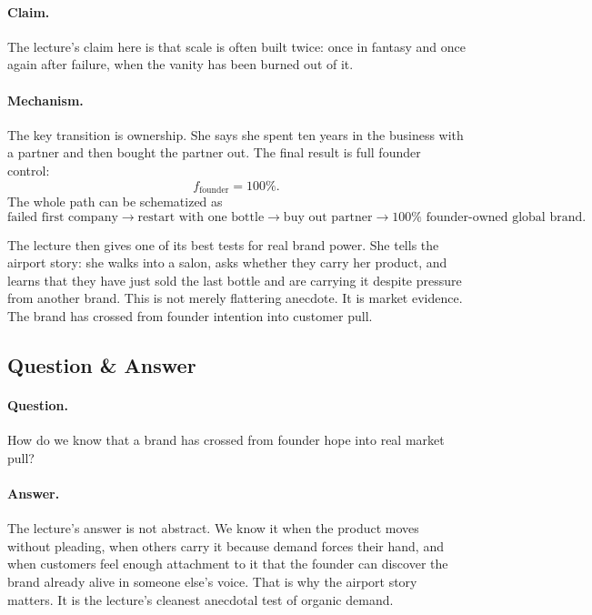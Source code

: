 \paragraph{Claim.}
The lecture's claim here is that scale is often built twice: once in fantasy and once again after failure, when the vanity has been burned out of it.

\paragraph{Mechanism.}
The key transition is ownership. She says she spent ten years in the business with a partner and then bought the partner out. The final result is full founder control:
\begin{equation}
f_{\text{founder}} = 100\%.
\end{equation}
The whole path can be schematized as
\begin{equation}
\text{failed first company}
\to
\text{restart with one bottle}
\to
\text{buy out partner}
\to
100\% \text{ founder-owned global brand}.
\end{equation}

The lecture then gives one of its best tests for real brand power. She tells the airport story: she walks into a salon, asks whether they carry her product, and learns that they have just sold the last bottle and are carrying it despite pressure from another brand. This is not merely flattering anecdote. It is market evidence. The brand has crossed from founder intention into customer pull.

\subsection{Question \& Answer}

\paragraph{Question.}
How do we know that a brand has crossed from founder hope into real market pull?

\paragraph{Answer.}
The lecture's answer is not abstract. We know it when the product moves without pleading, when others carry it because demand forces their hand, and when customers feel enough attachment to it that the founder can discover the brand already alive in someone else's voice. That is why the airport story matters. It is the lecture's cleanest anecdotal test of organic demand.

